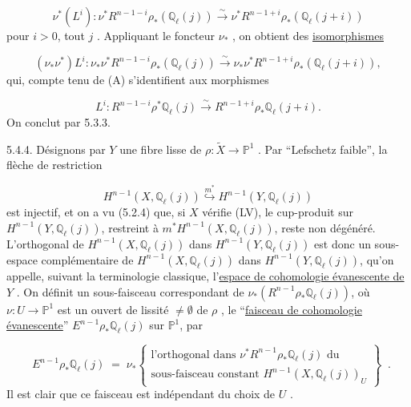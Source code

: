 \begin{equation}\tag{5.4.1}
\nu^*(L^i) : \nu^*R^{n-1-i}\rho_*(\mathbb{Q}_\ell(j)) \overset{\sim}{\longrightarrow} \nu^*R^{n-1+i}\rho_*(\mathbb{Q}_\ell(j+i))
\end{equation}
pour $i > 0$, tout $j$ . Appliquant le foncteur $\nu_*$ , on obtient des \underline{isomorphismes}

\begin{equation}\tag{5.4.2}
(\nu_*\nu^*) L^i : \nu_*\nu^* R^{n-1-i}\rho_*(\mathbb{Q}_\ell(j)) \overset{\sim}{\longrightarrow} \nu_*\nu^*R^{n-1+i}\rho_*(\mathbb{Q}_\ell(j+i)),
\end{equation}
qui, compte tenu de (A) s'identifient aux morphismes

\begin{equation}\tag{5.4.3}
L^i : R^{n-1-i}\rho^*\mathbb{Q}_\ell(j) \overset{\sim}{\longrightarrow} R^{n-1+i}\rho_*\mathbb{Q}_\ell(j+i) .
\end{equation}
On conclut par 5.3.3.

5.4.4. Désignons par $Y$ une fibre lisse de $\rho : \widetilde{X} \longrightarrow \mathbb{P}^1$ . Par ``Lefschetz faible'', la flèche de restriction

\begin{equation*}
H^{n-1}(X,\mathbb{Q}_\ell(j)) \overset{m^*}{\hookrightarrow} H^{n-1}(Y,\mathbb{Q}_\ell(j))
\end{equation*}
est injectif, et on a vu (5.2.4) que, si $X$ vérifie (LV), le cup-produit sur $H^{n-1}(Y,\mathbb{Q}_\ell(j))$, restreint à $m^* H^{n-1}(X,\mathbb{Q}_\ell(j))$, reste non dégénéré. L'orthogonal de $H^{n-1}(X,\mathbb{Q}_\ell(j))$ dans $H^{n-1}(Y,\mathbb{Q}_\ell(j))$ est donc un sous-espace complémentaire de $H^{n-1}(X,\mathbb{Q}_\ell(j))$ dans $H^{n-1}(Y,\mathbb{Q}_\ell(j))$, qu'on appelle, suivant la terminologie classique, l'\underline{espace de cohomologie évanescente de} $Y$ . On définit un sous-faisceau correspondant de $\nu_*(R^{n-1}\rho_*\mathbb{Q}_\ell(j))$, où $\nu : U \longrightarrow \mathbb{P}^1$ est un ouvert de lissité $\neq \emptyset$ de $\rho$ , le ``\underline{faisceau de cohomologie évanescente}'' $E^{n-1}\rho_*\mathbb{Q}_\ell(j)$ sur $\mathbb{P}^1$, par 



\begin{equation}\tag{5.4.4.1}
 \;\; E^{n-1}\rho_*\mathbb{Q}_\ell(j) \;=\; \nu_*\left\{\begin{array}{l}\text{l'orthogonal dans } \nu^*R^{n-1}\rho_*\mathbb{Q}_\ell(j) \text{ du}\\[2ex]\text{sous-faisceau constant } H^{n-1}(X,\mathbb{Q}_\ell(j))_U\end{array}\right\} \;\;.
\end{equation}
Il est clair que ce faisceau est indépendant du choix de $U$ .


